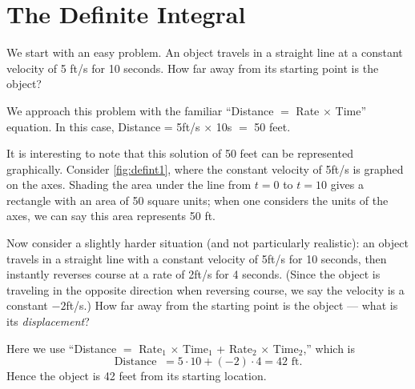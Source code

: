 \section{The Definite Integral}\label{sec:def_int}

We start with an easy problem. An object travels in a straight line at a constant velocity of 5 ft/s for 10 seconds. How far away from its starting point is the object?

We approach this problem with the familiar ``Distance $=$ Rate $\times$ Time'' equation. In this case, Distance = 5ft/s $\times$ 10s $=$ 50 feet.

It is interesting to note that this solution of 50 feet can be represented graphically. Consider \autoref{fig:defint1}, where the constant velocity of 5ft/s is graphed on the axes. Shading the area under the line from $t=0$ to $t=10$ gives a rectangle with an area of 50 square units; when one considers the units of the axes, we can say this area represents 50 ft.


Now consider a slightly harder situation (and not particularly realistic): an object travels in a straight line with a constant velocity of 5ft/s for 10 seconds, then instantly reverses course at a rate of 2ft/s for 4 seconds. (Since the object is traveling in the opposite direction when reversing course, we say the velocity is a constant $-2$ft/s.) How far away from the starting point is the object --- what is its \emph{displacement}?

Here we use ``Distance $=$ Rate$_1$ $\times$ Time$_1$ + Rate$_2$ $\times$ Time$_2$,'' which is 
\[\text{Distance } \ = 5\cdot10 + (-2)\cdot 4 = 42\text{ ft.}\]
Hence the object is 42 feet from its starting location.

